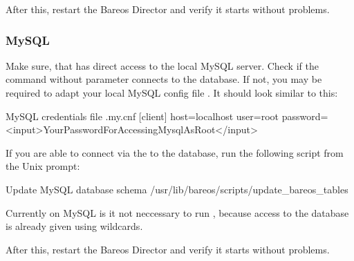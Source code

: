 After this, restart the Bareos Director and verify it starts without problems.

\subsubsection{MySQL}
Make sure, that  has direct access to the local MySQL server.
Check if the command  without parameter connects to the database.
If not, you may be required to adapt your local MySQL config file .
It should look similar to this:

\begin{config}{MySQL credentials file .my.cnf}
[client]
host=localhost
user=root
password=<input>YourPasswordForAccessingMysqlAsRoot</input>
\end{config}

If you are able to connect via the  to the database, run the following script from the Unix prompt:
\begin{commands}{Update MySQL database schema}
/usr/lib/bareos/scripts/update_bareos_tables
\end{commands}

Currently on MySQL is it not neccessary to run , because access to the database is already given using wildcards.

After this, restart the Bareos Director and verify it starts without problems.
